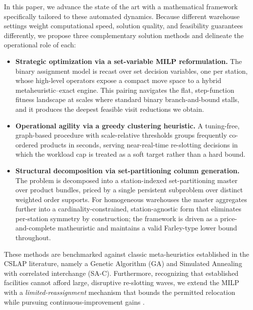 \documentclass[preprint,review,11pt,authoryear]{elsarticle}
\begin{document}
In this paper, we advance the state of the art with a mathematical framework specifically tailored to these automated dynamics. Because different warehouse settings weight computational speed, solution quality, and feasibility guarantees differently, we propose three complementary solution methods and delineate the operational role of each:
\begin{itemize}
    \item \textbf{Strategic optimization via a set-variable MILP reformulation.} The binary assignment model is recast over set decision variables, one per station, whose high-level operators expose a compact move space to a hybrid metaheuristic--exact engine. This pairing navigates the flat, step-function fitness landscape at scales where standard binary branch-and-bound stalls, and it produces the deepest feasible visit reductions we obtain.
    \item \textbf{Operational agility via a greedy clustering heuristic.} A tuning-free, graph-based procedure with scale-relative thresholds groups frequently co-ordered products in seconds, serving near-real-time re-slotting decisions in which the workload cap is treated as a soft target rather than a hard bound.
    \item \textbf{Structural decomposition via set-partitioning column generation.} The problem is decomposed into a station-indexed set-partitioning master over product bundles, priced by a single persistent subproblem over distinct weighted order supports. For homogeneous warehouses the master aggregates further into a cardinality-constrained, station-agnostic form that eliminates per-station symmetry by construction; the framework is driven as a price-and-complete matheuristic and maintains a valid Farley-type lower bound throughout.
\end{itemize}
These methods are benchmarked against classic meta-heuristics established in the CSLAP literature, namely a Genetic Algorithm (GA) and Simulated Annealing with correlated interchange (SA-C). Furthermore, recognizing that established facilities cannot afford large, disruptive re-slotting waves, we extend the MILP with a \emph{limited-reassignment} mechanism that bounds the permitted relocation while pursuing continuous-improvement gains \cite{chabot2024reassignment}.
\end{document}

